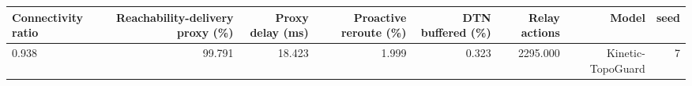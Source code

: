 \begin{tabular}{lrrrrrrr}
\toprule
Connectivity ratio & Reachability-delivery proxy (\%) & Proxy delay (ms) & Proactive reroute (\%) & DTN buffered (\%) & Relay actions & Model & seed \\
\midrule
0.938 & 99.791 & 18.423 & 1.999 & 0.323 & 2295.000 & Kinetic-TopoGuard & 7 \\
\bottomrule
\end{tabular}